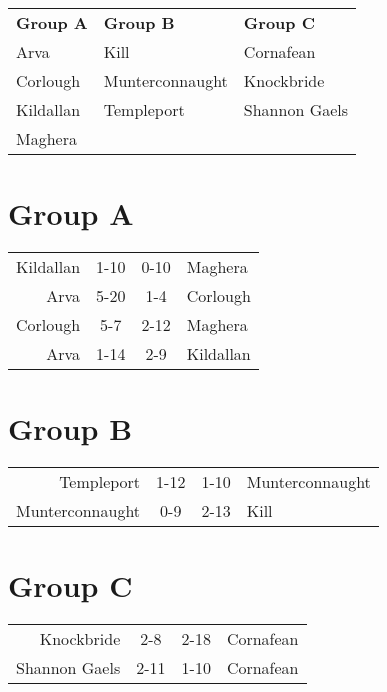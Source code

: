 \documentclass[11pt,a4paper]{article}
\begin{document}
\begin{tabular}{lll}
\textbf{Group A} & \textbf{Group B} & \textbf{Group C} \\
Arva & Kill & Cornafean \\
Corlough & Munterconnaught & Knockbride \\
Kildallan & Templeport & Shannon Gaels \\
Maghera & & \\
\end{tabular}

\section*{Group A}

\begin{tabular}{rccl}
Kildallan & 1-10 & 0-10 & Maghera \\
Arva & 5-20 & 1-4 & Corlough \\
Corlough & 5-7 & 2-12 & Maghera \\
Arva & 1-14 & 2-9 & Kildallan
\end{tabular}

\section*{Group B}

\begin{tabular}{rccl}
Templeport & 1-12 & 1-10 & Munterconnaught \\
Munterconnaught & 0-9 & 2-13 & Kill \\
\end{tabular}

\section*{Group C}

\begin{tabular}{rccl}
Knockbride & 2-8 & 2-18 & Cornafean \\
Shannon Gaels & 2-11 & 1-10 & Cornafean \\
\end{tabular}
\end{document}
